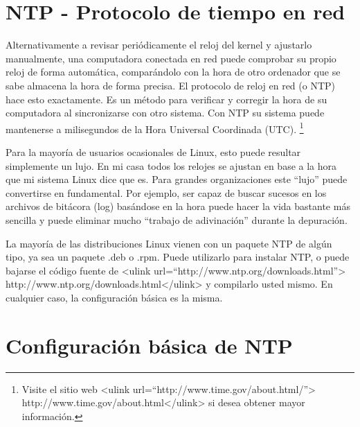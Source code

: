 \documentclass[12pt]{article}
\begin{document}
\section*{NTP - Protocolo de tiempo en red}

Alternativamente a revisar periódicamente el reloj del kernel y ajustarlo 
manualmente, una computadora conectada en red puede 
comprobar su propio reloj de forma automática, comparándolo con la hora
de otro ordenador que se sabe almacena la hora de forma precisa. El 
protocolo de reloj en red (o NTP) hace esto exactamente. Es un método para 
verificar y corregir la hora de su computadora al sincronizarse con otro 
sistema. Con NTP su sistema puede mantenerse a milisegundos de la Hora 
Universal Coordinada (UTC). 
	\footnote{Visite el sitio web <ulink url=``http://www.time.gov/about.html/''>
		http://www.time.gov/about.html</ulink> si desea obtener mayor información.
		}
	
Para la mayoría de usuarios ocasionales de Linux, esto puede resultar
simplemente un lujo. En mi casa todos los relojes se ajustan en base a 
la hora que mi sistema Linux dice que es. Para grandes organizaciones 
este ``lujo'' puede convertirse en fundamental. Por ejemplo, ser capaz de 
buscar sucesos en los archivos de bitácora (log) basándose en la hora puede hacer la vida 
bastante más sencilla y puede eliminar mucho ``trabajo de adivinación'' 
durante la depuración.






La mayoría de las distribuciones Linux vienen con un paquete NTP de
algún tipo, ya sea un paquete .deb o .rpm. Puede utilizarlo para instalar
NTP, o puede bajarse el código fuente de
<ulink url=``http://www.ntp.org/downloads.html''>
http://www.ntp.org/downloads.html</ulink> y compilarlo usted mismo. En
cualquier caso, la configuración básica es la misma.





\section*{ Configuración básica de NTP}
\end{document}
